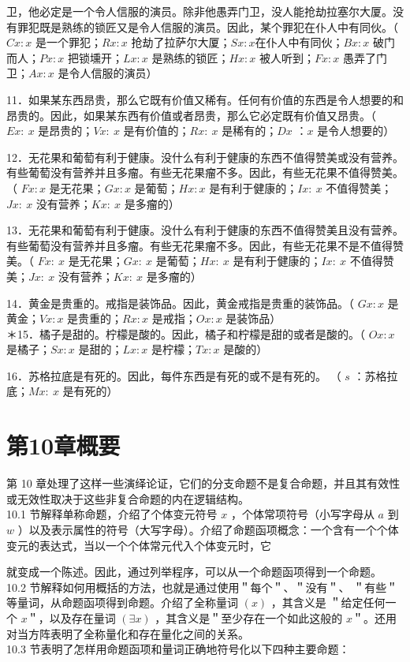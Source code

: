 卫，他必定是一个令人信服的演员。除非他愚弄门卫，没人能抢劫拉塞尔大厦。没有罪犯既是熟练的锁匠又是令人信服的演员。因此，某个罪犯在仆人中有同伙。（ $C x: x$ 是一个罪犯；$R x: x$ 抢劫了拉萨尔大厦；$S x: x$在仆人中有同伙；$B x: x$ 破门而人；$P x: x$ 把锁壎开；$L x: x$ 是熟练的锁匠；$H x: x$ 被人听到；$F x: x$ 愚弄了门卫；$A x: x$ 是令人信服的演员）

11．如果某东西昂贵，那么它既有价值又稀有。任何有价值的东西是令人想要的和昂贵的。因此，如果某东西有价值或者昂贵，那么它必定既有价值又昂贵。（ $E x: ~ x$ 是昂贵的；$V x: ~ x$ 是有价值的；$R x: ~ x$ 是稀有的；$D x$ ：$x$ 是令人想要的）

12．无花果和葡萄有利于健康。没什么有利于健康的东西不值得赞美或没有营养。有些葡萄没有营养并且多瘤。有些无花果瘤不多。因此，有些无花果不值得赞美。（ $F x: x$ 是无花果；$G x: x$ 是葡萄；$H x: x$ 是有利于健康的；$I x: ~ x$ 不值得赞美；$J x: ~ x$ 没有营养；$K x: ~ x$ 是多瘤的）

13．无花果和葡萄有利于健康。没什么有利于健康的东西不值得赞美且没有营养。有些葡萄没有营养并且多瘤。有些无花果瘤不多。因此，有些无花果不是不值得赞美。（ $F x: ~ x$ 是无花果；$G x: ~ x$ 是葡萄；$H x: ~ x$ 是有利于健康的；$I x: ~ x$ 不值得赞美；$J x: ~ x$ 没有营养；$K x: ~ x$ 是多瘤的）

14．黄金是贵重的。戒指是装饰品。因此，黄金戒指是贵重的装饰品。（ $G x: x$ 是黄金；$V x: x$ 是贵重的；$R x: x$ 是戒指；$O x: x$ 是装饰品）\\
＊15．橘子是甜的。柠檬是酸的。因此，橘子和柠檬是甜的或者是酸的。（ $O x: x$ 是橘子；$S x: x$ 是甜的；$L x: x$ 是柠檬；$T x: x$ 是酸的）

16．苏格拉底是有死的。因此，每件东西是有死的或不是有死的。 （ $s$ ：苏格拉底；$M x: ~ x$ 是有死的）

\section*{第10章概要}
第 10 章处理了这样一些演绎论证，它们的分支命题不是复合命题，并且其有效性或无效性取决于这些非复合命题的内在逻辑结构。\\
10.1 节解释单称命题，介绍了个体变元符号 $x$ ，个体常项符号（小写字母从 $a$ 到 $w$ ）以及表示属性的符号（大写字母）。介绍了命题函项概念：一个含有一个个体变元的表达式，当以一个个体常元代入个体变元时，它

就变成一个陈述。因此，通过列举程序，可以从一个命题函项得到一个命题。\\
10.2 节解释如何用概括的方法，也就是通过使用＂每个＂、＂没有＂、 ＂有些＂等量词，从命题函项得到命题。介绍了全称量词 $(x)$ ，其含义是 ＂给定任何一个 $x$＂，以及存在量词 $(\exists x)$ ，其含义是＂至少存在一个如此这般的 $x$＂。还用对当方阵表明了全称量化和存在量化之间的关系。\\
10.3 节表明了怎样用命题函项和量词正确地符号化以下四种主要命题：

